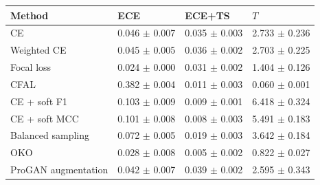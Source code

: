 \begin{tabular}{llll}
\toprule
Method & ECE & ECE+TS & $T$\\
\midrule
CE & \num{0.046} $\pm$ \num{0.007} & \num{0.035} $\pm$ \num{0.003} & \num{2.733} $\pm$ \num{0.236}\\
Weighted CE & \num{0.045} $\pm$ \num{0.005} & \num{0.036} $\pm$ \num{0.002} & \num{2.703} $\pm$ \num{0.225}\\
Focal loss & \num{0.024} $\pm$ \num{0.000} & \num{0.031} $\pm$ \num{0.002} & \num{1.404} $\pm$ \num{0.126}\\
CFAL & \num{0.382} $\pm$ \num{0.004} & \num{0.011} $\pm$ \num{0.003} & \num{0.060} $\pm$ \num{0.001}\\
CE + soft F1 & \num{0.103} $\pm$ \num{0.009} & \num{0.009} $\pm$ \num{0.001} & \num{6.418} $\pm$ \num{0.324}\\
CE + soft MCC & \num{0.101} $\pm$ \num{0.008} & \num{0.008} $\pm$ \num{0.003} & \num{5.491} $\pm$ \num{0.183}\\
Balanced sampling & \num{0.072} $\pm$ \num{0.005} & \num{0.019} $\pm$ \num{0.003} & \num{3.642} $\pm$ \num{0.184}\\
OKO & \num{0.028} $\pm$ \num{0.008} & \num{0.005} $\pm$ \num{0.002} & \num{0.822} $\pm$ \num{0.027}\\
ProGAN augmentation & \num{0.042} $\pm$ \num{0.007} & \num{0.039} $\pm$ \num{0.002} & \num{2.595} $\pm$ \num{0.343}\\
\bottomrule
\end{tabular}
